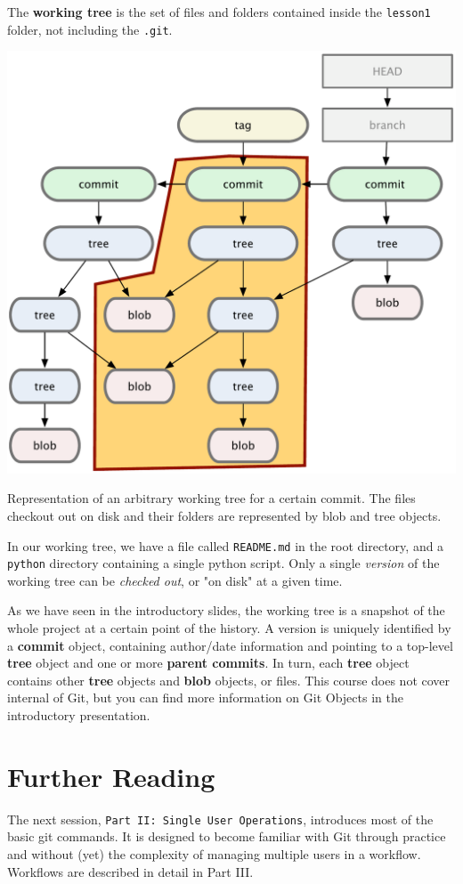 \documentclass[a4paper]{../../common/tufte-latex/tufte-handout}
\begin{document}
The \textbf{working tree} is the set of files and folders contained inside the \texttt{lesson1} folder, not including the \texttt{.git}.
\begin{marginfigure}%
  \centering
  \includegraphics[width=\linewidth]{tree.pdf}
  \label{fig:tree}
  \caption{Representation of an arbitrary working tree for a certain commit. The files checkout out on disk and their folders are represented by blob and tree objects.}
\end{marginfigure}
In our working tree, we have a file called \texttt{README.md} in the root directory, and a \texttt{python} directory containing a single python script.
Only a single \textit{version} of the working tree can be \textit{checked out}, or "on disk" at a given time.

As we have seen in the introductory slides, the working tree is a snapshot of the whole project at a certain point of the history.
A version is uniquely identified by a \textbf{commit} object, containing author/date information and pointing to a top-level \textbf{tree} object and one or more \textbf{parent commits}.
In turn, each \textbf{tree} object contains other \textbf{tree} objects and \textbf{blob} objects, or files.
This course does not cover internal of Git, but you can find more information on Git Objects in the introductory presentation.

\section{Further Reading}

The next session, \texttt{Part II: Single User Operations}, introduces most of the basic git commands. It is designed to become familiar with Git through practice and without (yet) the complexity of managing multiple users in a workflow. Workflows are described in detail in Part III.

%
%
\end{document}
